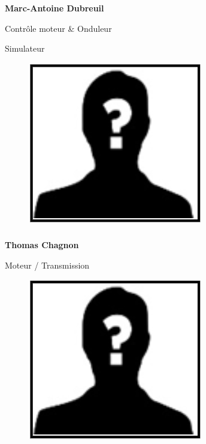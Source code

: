 \documentclass[a0paper,portrait]{baposter}
\begin{document}
\begin{poster}
{\subsubsection*{}
\vspace{-2mm}
\textbf{Marc-Antoine Dubreuil}

Contrôle moteur \& Onduleur

Simulateur

\begin{figure}
\includegraphics[width=.9\linewidth]{img/membres/membre_placeholder.png} 
\end{figure}
\subsubsection*{}
\vspace{2mm}
\textbf{Thomas Chagnon}

Moteur / Transmission

\begin{figure}
\includegraphics[width=.9\linewidth]{img/membres/membre_placeholder.png} 
\end{figure}
}
\end{poster}
\end{document}
